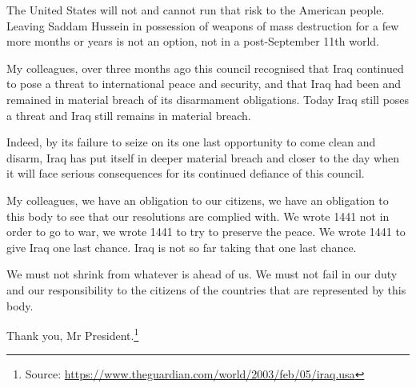 \documentclass[10pt,a4paper]{article}
\newcommand{\source}[1]{\footnote{Source: \href{#1}{#1}}}
\begin{document}
The United States will not and cannot run that risk to the American people. Leaving Saddam Hussein in possession of weapons of mass destruction for a few more months or years is not an option, not in a post-September 11th world.

My colleagues, over three months ago this council recognised that Iraq continued to pose a threat to international peace and security, and that Iraq had been and remained in material breach of its disarmament obligations. Today Iraq still poses a threat and Iraq still remains in material breach.

Indeed, by its failure to seize on its one last opportunity to come clean and disarm, Iraq has put itself in deeper material breach and closer to the day when it will face serious consequences for its continued defiance of this council.

My colleagues, we have an obligation to our citizens, we have an obligation to this body to see that our resolutions are complied with. We wrote 1441 not in order to go to war, we wrote 1441 to try to preserve the peace. We wrote 1441 to give Iraq one last chance. Iraq is not so far taking that one last chance.

We must not shrink from whatever is ahead of us. We must not fail in our duty and our responsibility to the citizens of the countries that are represented by this body.

Thank you, Mr President.\source{https://www.theguardian.com/world/2003/feb/05/iraq.usa}
\end{document}
